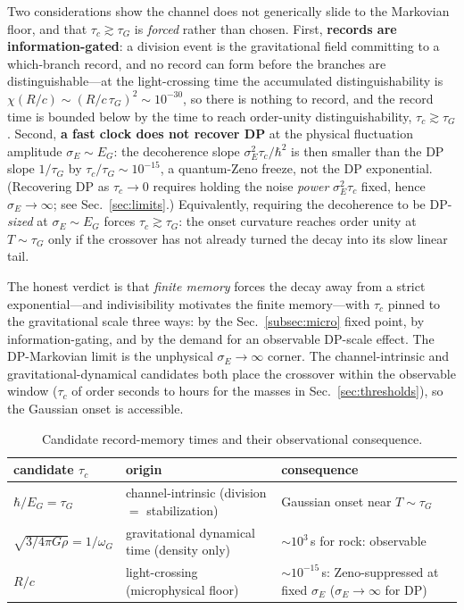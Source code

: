 \documentclass[aps,prd,onecolumn,amsmath,amssymb,nofootinbib,superscriptaddress]{revtex4-2}
\begin{document}
Two considerations show the channel does not generically slide to the Markovian floor, and that
$\tau_c\gtrsim\tau_G$ is \emph{forced} rather than chosen. First, \textbf{records are information-gated}:
a division event is the gravitational field committing to a which-branch record, and no record can form
before the branches are distinguishable---at the light-crossing time the accumulated distinguishability
is $\chi(R/c)\sim(R/c\,\tau_G)^2\sim10^{-30}$, so there is nothing to record, and the record time is
bounded below by the time to reach order-unity distinguishability, $\tau_c\gtrsim\tau_G$. Second,
\textbf{a fast clock does not recover DP} at the physical fluctuation amplitude $\sigma_E\sim E_G$: the
decoherence slope $\sigma_E^2\tau_c/\hbar^2$ is then smaller than the DP slope $1/\tau_G$ by
$\tau_c/\tau_G\sim10^{-15}$, a quantum-Zeno freeze, not the DP exponential. (Recovering DP as
$\tau_c\to0$ requires holding the noise \emph{power} $\sigma_E^2\tau_c$ fixed, hence
$\sigma_E\to\infty$; see Sec.~\ref{sec:limits}.) Equivalently, requiring the decoherence to be
DP-\emph{sized} at $\sigma_E\sim E_G$ forces $\tau_c\gtrsim\tau_G$: the onset curvature reaches order
unity at $T\sim\tau_G$ only if the crossover has not already turned the decay into its slow linear tail.

The honest verdict is that \emph{finite memory} forces the decay away from a strict exponential---and
indivisibility motivates the finite memory---with $\tau_c$ pinned to the gravitational scale three
ways: by the Sec.~\ref{subsec:micro} fixed point, by information-gating, and by the demand for an
observable DP-scale effect. The DP-Markovian limit is the unphysical $\sigma_E\to\infty$ corner. The
channel-intrinsic and gravitational-dynamical candidates both place the crossover within the observable
window ($\tau_c$ of order seconds to hours for the masses in Sec.~\ref{sec:thresholds}), so the
Gaussian onset is accessible.

\begin{table}[h]
\centering
\caption{Candidate record-memory times and their observational consequence.}\label{tab:tauc}
\begin{tabular}{lll}
\hline\hline
candidate $\tau_c$ & origin & consequence \\
\hline
$\hbar/E_G=\tau_G$ & channel-intrinsic (division $=$ stabilization) & Gaussian onset near $T\sim\tau_G$ \\
$\sqrt{3/4\pi G\rho}=1/\omega_G$ & gravitational dynamical time (density only) & $\sim10^3\,$s for rock: observable \\
$R/c$ & light-crossing (microphysical floor) & $\sim10^{-15}\,$s: Zeno-suppressed at fixed $\sigma_E$ ($\sigma_E\!\to\!\infty$ for DP) \\
\hline\hline
\end{tabular}
\end{table}
\end{document}

